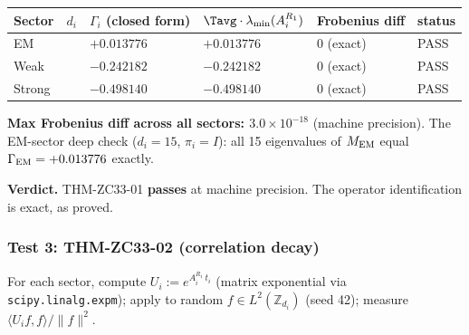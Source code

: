 \documentclass[12pt, a4paper]{article}
\begin{document}
\begin{derivedbox}[title={Test 2 results: $\Tavg\cdot A_i^{R_1}
  = \Gamma_i\cdot I_{d_i}$}]
{\small
\renewcommand{\arraystretch}{1.20}
\begin{tabular}{>{\centering\arraybackslash}p{1.8cm}
                >{\centering\arraybackslash}p{1.2cm}
                >{\centering\arraybackslash}p{2.2cm}
                >{\centering\arraybackslash}p{2.8cm}
                >{\centering\arraybackslash}p{2.4cm}
                >{\centering\arraybackslash}p{1.4cm}}
\toprule
Sector & $d_i$ & $\Gamma_i$ (closed form)
  & $\Tavg\cdot\lambda_{\min}(A_i^{R_1})$
  & Frobenius diff & status \\
\midrule
EM     & 15 & $+0.013776$ & $+0.013776$ & $0$ (exact)
  & PASS \\
Weak   &  5 & $-0.242182$ & $-0.242182$ & $0$ (exact)
  & PASS \\
Strong &  3 & $-0.498140$ & $-0.498140$ & $0$ (exact)
  & PASS \\
\bottomrule
\end{tabular}
}

\medskip
\textbf{Max Frobenius diff across all sectors: $3.0\times
10^{-18}$} (machine precision). The EM-sector deep check
($d_i=15$, $\pi_i = I$): all 15 eigenvalues of $M_{\rm EM}$
equal $\Gamma_{\rm EM} = +0.013776$ exactly.

\textbf{Verdict.} THM-ZC33-01 \textbf{passes} at machine
precision. The operator identification is exact, as proved.
\end{derivedbox}

\subsubsection{Test 3: THM-ZC33-02 (correlation decay)}

For each sector, compute $U_i := e^{A_i^{R_1}\,t_i}$ (matrix
exponential via \texttt{scipy.linalg.expm}); apply to random
$f\in L^2(\mathbb{Z}_{d_i})$ (seed 42); measure
$\langle U_i f, f\rangle / \|f\|^2$.
\end{document}
